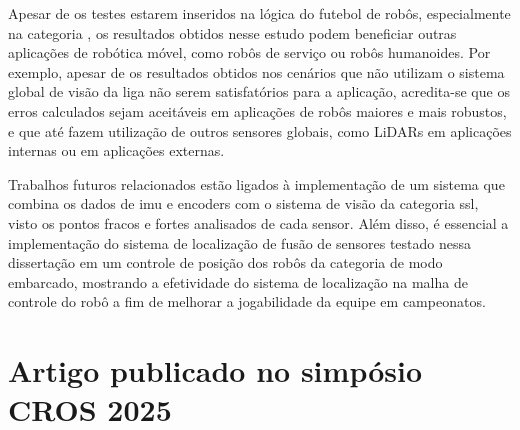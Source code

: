 \documentclass[acronym, symbols, table, deposito]{fei}
\begin{document}
	Apesar de os testes estarem inseridos na lógica do futebol de robôs, especialmente na categoria , os resultados obtidos nesse estudo podem beneficiar outras aplicações de robótica móvel, como robôs de serviço ou robôs humanoides. Por exemplo, apesar de os resultados obtidos nos cenários que não utilizam o sistema global de visão da liga não serem satisfatórios para a aplicação, acredita-se que os erros calculados sejam aceitáveis em aplicações de robôs maiores e mais robustos, e que até fazem utilização de outros sensores globais, como LiDARs em aplicações internas ou  em aplicações externas.
	
	Trabalhos futuros relacionados estão ligados à implementação de um sistema que combina os dados de \acrshort{imu} e encoders com o sistema de visão da categoria \acrshort{ssl}, visto os pontos fracos e fortes analisados de cada sensor. Além disso, é essencial a implementação do sistema de localização de fusão de sensores testado nessa dissertação em um controle de posição dos robôs da categoria de modo embarcado, mostrando a efetividade do sistema de localização na malha de controle do robô a fim de melhorar a jogabilidade da equipe em campeonatos.
	
\printbibliography

\anexos

\chapter{Artigo publicado no simpósio CROS 2025}

%
%

%

\end{document}
